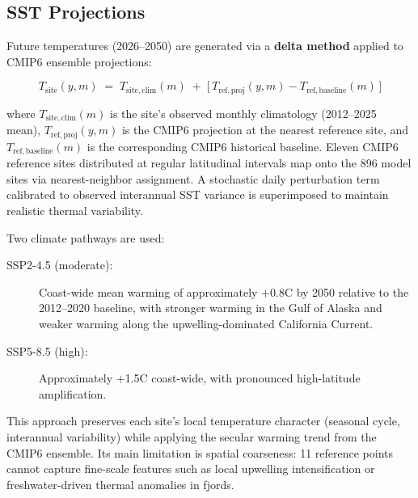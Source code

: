 \subsection{SST Projections}
\label{sec:sst_projections}

Future temperatures (2026--2050) are generated via a \textbf{delta method}
applied to CMIP6 ensemble projections:

\begin{equation}
  T_\mathrm{site}(y, m) \;=\; T_\mathrm{site,clim}(m) \;+\;
  \bigl[\, T_\mathrm{ref,proj}(y, m) - T_\mathrm{ref,baseline}(m) \,\bigr]
\end{equation}

\noindent where $T_\mathrm{site,clim}(m)$ is the site's observed monthly
climatology (2012--2025 mean), $T_\mathrm{ref,proj}(y, m)$ is the CMIP6
projection at the nearest reference site, and $T_\mathrm{ref,baseline}(m)$
is the corresponding CMIP6 historical baseline.  Eleven CMIP6 reference
sites distributed at regular latitudinal intervals map onto the 896 model
sites via nearest-neighbor assignment.  A stochastic daily perturbation
term calibrated to observed interannual SST variance is superimposed to
maintain realistic thermal variability.

Two climate pathways are used:
\begin{description}
  \item[SSP2-4.5 (moderate):] Coast-wide mean warming of approximately
    $+$0.8\textdegree C by 2050 relative to the 2012--2020 baseline, with
    stronger warming in the Gulf of Alaska and weaker warming along the
    upwelling-dominated California Current.
  \item[SSP5-8.5 (high):] Approximately $+$1.5\textdegree C coast-wide,
    with pronounced high-latitude amplification.
\end{description}

This approach preserves each site's local temperature character (seasonal
cycle, interannual variability) while applying the secular warming trend
from the CMIP6 ensemble.  Its main limitation is spatial coarseness: 11
reference points cannot capture fine-scale features such as local upwelling
intensification or freshwater-driven thermal anomalies in fjords.
